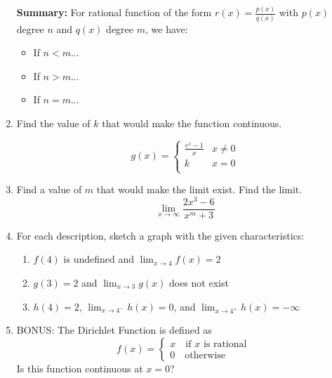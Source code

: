 \documentclass[12pt]{article}
\begin{document}
\begin{enumerate}
\begin{multicols}{2}
\begin{enumerate}[itemsep=1cm]
	\end{enumerate}
	\end{multicols}
\newpage

\hspace{20px}
\begin{tcolorbox}
\textbf{Summary:}
For rational function of the form $r(x)=\frac{p(x)}{q(x)}$ with $p(x)$ degree $n$ and $q(x)$ degree $m$, we have:\\
\begin{itemize}
\item If $n<m$...\\

\item  If $n>m$...\\
\item  If $n=m$...\\
\vspace{15mm}
\end{itemize}
\end{tcolorbox}

\item Find the value of $k$ that would make the function continuous.

	\[ g(x) = \begin{cases} 
      \frac{e^x-1}{x}& x\neq 0 \\
      k & x = 0 \\
   \end{cases} \]
\vfill

\item Find a value of $m$ that would make the limit exist. Find the limit.
$$ \lim_{x\to\infty}\frac{2x^3-6}{x^m+3}$$

\vfill
\item For each description, sketch a graph with the given characteristics:
	\begin{enumerate}
	\item $f(4)$ is undefined and $\displaystyle \lim_{x\to4} f(x)=2$
	\vfill
	\item $g(3)=2$ and $\displaystyle \lim_{x\to3} g(x)$ does not exist
	\vfill
	\item $h(4) = 2$,  $\displaystyle \lim_{x\to4^-} h(x)=0$, and $\displaystyle \lim_{x\to4^+} h(x)=-\infty$
	\vfill
	\end{enumerate}
	
\item BONUS: The Dirichlet Function is defined as 
$$f(x) = \left\{ \begin{array}{ll} x \quad \text{if } x \text{ is rational }  \\ 0 \quad \text{otherwise} \end{array} \right. $$
Is this function continuous at $x=0$?
\vfill
\end{enumerate}
\end{document}
